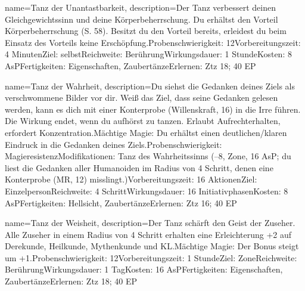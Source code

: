 {
    name={Tanz der Unantastbarkeit},
    description={Der Tanz verbessert deinen Gleichgewichtssinn und deine Körperbeherrschung. Du erhältst den Vorteil Körperbeherrschung (S. 58). Besitzt du den Vorteil bereits, erleidest du beim Einsatz des Vorteils keine Erschöpfung.\newline Probenschwierigkeit: 12\newline Vorbereitungszeit: 4 Minuten\newline Ziel: selbst\newline Reichweite: Berührung\newline Wirkungsdauer: 1 Stunde\newline Kosten: 8 AsP\newline Fertigkeiten: Eigenschaften, Zaubertänze\newline Erlernen: Ztz 18; 40 EP}
}


{
    name={Tanz der Wahrheit},
    description={Du siehst die Gedanken deines Ziels als verschwommene Bilder vor dir. Weiß das Ziel, dass seine Gedanken gelesen werden, kann es dich mit einer Konterprobe (Willenskraft, 16) in die Irre führen. Die Wirkung endet, wenn du aufhörst zu tanzen. Erlaubt Aufrechterhalten, erfordert Konzentration.\newline Mächtige Magie: Du erhältst einen deutlichen/klaren Eindruck in die Gedanken deines Ziels.\newline Probenschwierigkeit: Magieresistenz\newline Modifikationen: Tanz des Wahrheitssinns (–8, Zone, 16 AsP; du liest die Gedanken aller Humanoiden im Radius von 4 Schritt, denen eine Konterprobe (MR, 12) misslingt.)\newline Vorbereitungszeit: 16 Aktionen\newline Ziel: Einzelperson\newline Reichweite: 4 Schritt\newline Wirkungsdauer: 16 Initiativphasen\newline Kosten: 8 AsP\newline Fertigkeiten: Hellsicht, Zaubertänze\newline Erlernen: Ztz 16; 40 EP}
}


{
    name={Tanz der Weisheit},
    description={Der Tanz schärft den Geist der Zuseher. Alle Zuseher in einem Radius von 4 Schritt erhalten eine Erleichterung +2 auf Derekunde, Heilkunde, Mythenkunde und KL.\newline Mächtige Magie: Der Bonus steigt um +1.\newline Probenschwierigkeit: 12\newline Vorbereitungszeit: 1 Stunde\newline Ziel: Zone\newline Reichweite: Berührung\newline Wirkungsdauer: 1 Tag\newline Kosten: 16 AsP\newline Fertigkeiten: Eigenschaften, Zaubertänze\newline Erlernen: Ztz 18; 40 EP}
}


